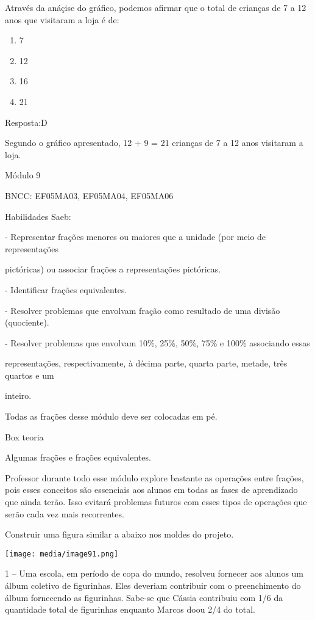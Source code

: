 Através da anáçise do gráfico, podemos afirmar que o total de crianças
de 7 a 12 anos que visitaram a loja é de:

\begin{enumerate}
\def\labelenumi{\alph{enumi})}
\item
  7
\item
  12
\item
  16
\item
  21
\end{enumerate}

Resposta:D

Segundo o gráfico apresentado, 12 + 9 = 21 crianças de 7 a 12 anos
visitaram a loja.

Módulo 9

BNCC: EF05MA03, EF05MA04, EF05MA06

Habilidades Saeb:

- Representar frações menores ou maiores que a unidade (por meio de
representações

pictóricas) ou associar frações a representações pictóricas.

- Identificar frações equivalentes.

- Resolver problemas que envolvam fração como resultado de uma divisão
(quociente).

- Resolver problemas que envolvam 10\%, 25\%, 50\%, 75\% e 100\%
associando essas

representações, respectivamente, à décima parte, quarta parte, metade,
três quartos e um

inteiro.

Todas as frações desse módulo deve ser colocadas em pé.

Box teoria

Algumas frações e frações equivalentes.

Professor durante todo esse módulo explore bastante as operações entre
frações, pois esses conceitos são essenciais aos alunos em todas as
fases de aprendizado que ainda terão. Isso evitará problemas futuros com
esses tipos de operações que serão cada vez mais recorrentes.

Construir uma figura similar a abaixo nos moldes do projeto.

\texttt{[image: media/image91.png]}

1 -- Uma escola, em período de copa do mundo, resolveu fornecer aos
alunos um álbum coletivo de figurinhas. Eles deveriam contribuir com o
preenchimento do álbum fornecendo as figurinhas. Sabe-se que Cássia
contribuiu com 1/6 da quantidade total de figurinhas enquanto Marcos
doou 2/4 do total.

